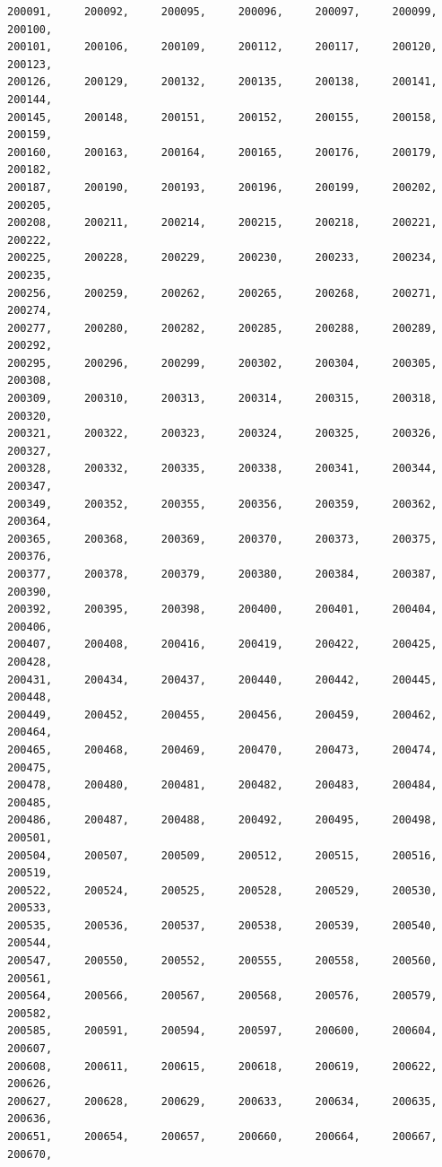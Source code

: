 \documentclass[a4paper,11pt]{report}
\begin{document}
\begin{verbatim}
200091,     200092,     200095,     200096,     200097,     200099,     200100,
200101,     200106,     200109,     200112,     200117,     200120,     200123,
200126,     200129,     200132,     200135,     200138,     200141,     200144,
200145,     200148,     200151,     200152,     200155,     200158,     200159,
200160,     200163,     200164,     200165,     200176,     200179,     200182,
200187,     200190,     200193,     200196,     200199,     200202,     200205,
200208,     200211,     200214,     200215,     200218,     200221,     200222,
200225,     200228,     200229,     200230,     200233,     200234,     200235,
200256,     200259,     200262,     200265,     200268,     200271,     200274,
200277,     200280,     200282,     200285,     200288,     200289,     200292,
200295,     200296,     200299,     200302,     200304,     200305,     200308,
200309,     200310,     200313,     200314,     200315,     200318,     200320,
200321,     200322,     200323,     200324,     200325,     200326,     200327,
200328,     200332,     200335,     200338,     200341,     200344,     200347,
200349,     200352,     200355,     200356,     200359,     200362,     200364,
200365,     200368,     200369,     200370,     200373,     200375,     200376,
200377,     200378,     200379,     200380,     200384,     200387,     200390,
200392,     200395,     200398,     200400,     200401,     200404,     200406,
200407,     200408,     200416,     200419,     200422,     200425,     200428,
200431,     200434,     200437,     200440,     200442,     200445,     200448,
200449,     200452,     200455,     200456,     200459,     200462,     200464,
200465,     200468,     200469,     200470,     200473,     200474,     200475,
200478,     200480,     200481,     200482,     200483,     200484,     200485,
200486,     200487,     200488,     200492,     200495,     200498,     200501,
200504,     200507,     200509,     200512,     200515,     200516,     200519,
200522,     200524,     200525,     200528,     200529,     200530,     200533,
200535,     200536,     200537,     200538,     200539,     200540,     200544,
200547,     200550,     200552,     200555,     200558,     200560,     200561,
200564,     200566,     200567,     200568,     200576,     200579,     200582,
200585,     200591,     200594,     200597,     200600,     200604,     200607,
200608,     200611,     200615,     200618,     200619,     200622,     200626,
200627,     200628,     200629,     200633,     200634,     200635,     200636,
200651,     200654,     200657,     200660,     200664,     200667,     200670,

\end{verbatim}
\end{document}
